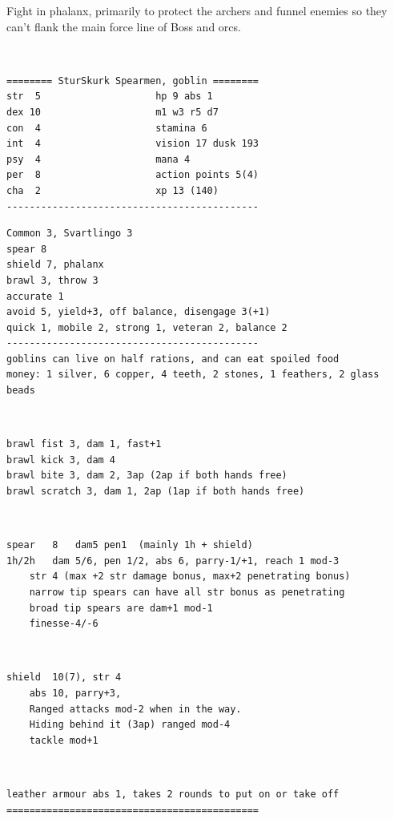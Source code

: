 Fight in phalanx, primarily to protect the archers and funnel enemies so they can't flank the main force line of Boss and orcs.

\

\goodbreak \small \begin{samepage} \begin{verbatim}
======== SturSkurk Spearmen, goblin ========
str  5                    hp 9 abs 1
dex 10                    m1 w3 r5 d7
con  4                    stamina 6
int  4                    vision 17 dusk 193
psy  4                    mana 4
per  8                    action points 5(4)
cha  2                    xp 13 (140)
--------------------------------------------
\end{verbatim} \goodbreak \begin{verbatim}
Common 3, Svartlingo 3
spear 8
shield 7, phalanx
brawl 3, throw 3
accurate 1
avoid 5, yield+3, off balance, disengage 3(+1)
quick 1, mobile 2, strong 1, veteran 2, balance 2
--------------------------------------------
goblins can live on half rations, and can eat spoiled food
money: 1 silver, 6 copper, 4 teeth, 2 stones, 1 feathers, 2 glass beads
\end{verbatim} \begin{samepage}   \   \goodbreak \end{samepage} \begin{verbatim}
brawl fist 3, dam 1, fast+1
brawl kick 3, dam 4 
brawl bite 3, dam 2, 3ap (2ap if both hands free)
brawl scratch 3, dam 1, 2ap (1ap if both hands free)
\end{verbatim} \begin{samepage}   \   \goodbreak \end{samepage} \begin{verbatim}
spear   8   dam5 pen1  (mainly 1h + shield)
1h/2h   dam 5/6, pen 1/2, abs 6, parry-1/+1, reach 1 mod-3
    str 4 (max +2 str damage bonus, max+2 penetrating bonus)
    narrow tip spears can have all str bonus as penetrating
    broad tip spears are dam+1 mod-1
    finesse-4/-6
\end{verbatim} \begin{samepage}   \   \goodbreak \end{samepage} \begin{verbatim}
shield  10(7), str 4
    abs 10, parry+3,
    Ranged attacks mod-2 when in the way.
    Hiding behind it (3ap) ranged mod-4
    tackle mod+1
\end{verbatim} \begin{samepage}   \   \goodbreak \end{samepage} \begin{verbatim}
leather armour abs 1, takes 2 rounds to put on or take off
============================================
\end{verbatim} \end{samepage} \normalsize


